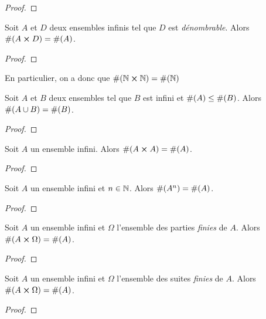 \ifdefined\outputproof
\begin{proof}

\end{proof}
\fi

\begin{theorem}
	\label{thm:cartesian_product_denombrable_infini_infini}
	Soit $A$ et $D$ deux ensembles infinis tel que $D$ est \textit{dénombrable}.
	Alors $\#(A \cross D) = \#(A)$.
\end{theorem}

\ifdefined\outputproof
\begin{proof}

\end{proof}
\fi

En particulier, on a donc que $\#(\mathbb{N} \cross \mathbb{N}) = \#(\mathbb{N})$

\begin{corollary}
	\label{cor:union_infini_set}
	Soit $A$ et $B$ deux ensembles tel que $B$ est infini et $\#(A) \leq \#(B)$.
	Alors $\#(A \cup B) = \#(B)$.
\end{corollary}

\ifdefined\outputproof
\begin{proof}

\end{proof}
\fi

\begin{theorem}
	Soit $A$ un ensemble infini. Alors $\#(A \cross A) = \#(A)$.
	\label{thm:card_cart_product_infini}
\end{theorem}

\ifdefined\outputproof
\begin{proof}

\end{proof}
\fi

\begin{corollary}
	Soit $A$ un ensemble infini et $n \in \mathbb{N}$. Alors $\#(A^{n}) =
	\#(A)$.
\end{corollary}

\ifdefined\outputproof
\begin{proof}

\end{proof}
\fi

\begin{corollary}
	Soit $A$ un ensemble infini et $\Omega$ l'ensemble des parties
	\textit{finies} de $A$. Alors $\#(A \cross \Omega) = \#(A)$.
\end{corollary}

\ifdefined\outputproof
\begin{proof}

\end{proof}
\fi

\begin{corollary}
	Soit $A$ un ensemble infini et $\Omega$ l'ensemble des suites
	\textit{finies} de $A$. Alors $\#(A \cross \Omega) = \#(A)$.
\end{corollary}

\ifdefined\outputproof
\begin{proof}

\end{proof}
\fi

